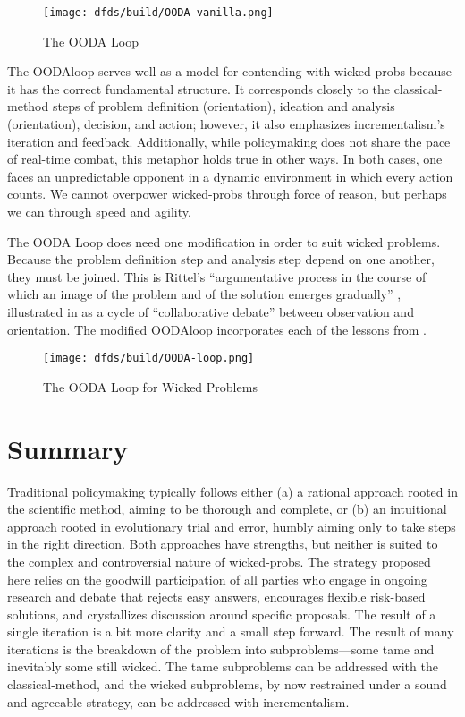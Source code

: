 \begin{figure}[h]
    \centering\CaptionFontSize
    \texttt{[image: dfds/build/OODA-vanilla.png]}
    \caption{The OODA Loop}
    \label{fig-ooda-loop}
\end{figure}

The \ac{OODAloop} serves well as a model for contending with \acp{wicked-prob} because it has the correct fundamental
structure. It corresponds closely to the \ac{classical-method} steps of problem definition (orientation), ideation and
analysis (orientation), decision, and action; however, it also emphasizes \ac{incrementalism}'s iteration and feedback.
Additionally, while policymaking does not share the pace of real-time combat, this metaphor holds true in other ways. In
both cases, one faces an unpredictable opponent in a dynamic environment in which every action counts. We cannot
overpower \acp{wicked-prob} through force of reason, but perhaps we can through speed and agility.

The OODA Loop does need one modification in order to suit wicked problems. Because the problem definition step and
analysis step depend on one another, they must be joined. This is Rittel's ``argumentative process in the course of
which an image of the problem and of the solution emerges gradually'' \cite{rittel_dilemmas_1973}, illustrated in
 as a cycle of ``collaborative debate'' between observation and orientation. The modified
\ac{OODAloop} incorporates each of the lessons from .

\begin{figure}[h]
    \centering\CaptionFontSize
    \texttt{[image: dfds/build/OODA-loop.png]}
    \caption{The OODA Loop for Wicked Problems}
    \label{fig-policy-ooda-loop}
\end{figure}


\section{Summary}

Traditional policymaking typically follows either (a) a rational approach rooted in the scientific method, aiming to be
thorough and complete, or (b) an intuitional approach rooted in evolutionary trial and error, humbly aiming only to take
steps in the right direction. Both approaches have strengths, but neither is suited to the complex and controversial
nature of \acp{wicked-prob}. The strategy proposed here relies on the goodwill participation of all parties who engage
in ongoing research and debate that rejects easy answers, encourages flexible risk-based solutions, and crystallizes
discussion around specific proposals. The result of a single iteration is a bit more clarity and a small step forward.
The result of many iterations is the breakdown of the problem into subproblems---some tame and inevitably some still
wicked. The tame subproblems can be addressed with the \ac{classical-method}, and the wicked subproblems, by now
restrained under a sound and agreeable strategy, can be addressed with \ac{incrementalism}.


